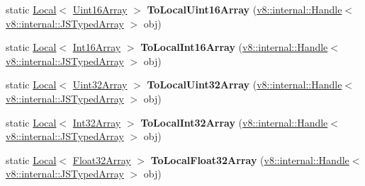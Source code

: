 \begin{DoxyCompactItemize}
\item 
static \hyperlink{classv8_1_1_local}{Local}$<$ \hyperlink{classv8_1_1_uint16_array}{Uint16\+Array} $>$ {\bfseries To\+Local\+Uint16\+Array} (\hyperlink{classv8_1_1internal_1_1_handle}{v8\+::internal\+::\+Handle}$<$ \hyperlink{classv8_1_1internal_1_1_j_s_typed_array}{v8\+::internal\+::\+J\+S\+Typed\+Array} $>$ obj)\hypertarget{classv8_1_1_utils_a2a3de4421377bd956ff04955b2d41f6d}{}\label{classv8_1_1_utils_a2a3de4421377bd956ff04955b2d41f6d}

\item 
static \hyperlink{classv8_1_1_local}{Local}$<$ \hyperlink{classv8_1_1_int16_array}{Int16\+Array} $>$ {\bfseries To\+Local\+Int16\+Array} (\hyperlink{classv8_1_1internal_1_1_handle}{v8\+::internal\+::\+Handle}$<$ \hyperlink{classv8_1_1internal_1_1_j_s_typed_array}{v8\+::internal\+::\+J\+S\+Typed\+Array} $>$ obj)\hypertarget{classv8_1_1_utils_ac87df11d66de4fdcfed5b558d4d566c0}{}\label{classv8_1_1_utils_ac87df11d66de4fdcfed5b558d4d566c0}

\item 
static \hyperlink{classv8_1_1_local}{Local}$<$ \hyperlink{classv8_1_1_uint32_array}{Uint32\+Array} $>$ {\bfseries To\+Local\+Uint32\+Array} (\hyperlink{classv8_1_1internal_1_1_handle}{v8\+::internal\+::\+Handle}$<$ \hyperlink{classv8_1_1internal_1_1_j_s_typed_array}{v8\+::internal\+::\+J\+S\+Typed\+Array} $>$ obj)\hypertarget{classv8_1_1_utils_a3ed505929d16003bffd8a4dd0948ad77}{}\label{classv8_1_1_utils_a3ed505929d16003bffd8a4dd0948ad77}

\item 
static \hyperlink{classv8_1_1_local}{Local}$<$ \hyperlink{classv8_1_1_int32_array}{Int32\+Array} $>$ {\bfseries To\+Local\+Int32\+Array} (\hyperlink{classv8_1_1internal_1_1_handle}{v8\+::internal\+::\+Handle}$<$ \hyperlink{classv8_1_1internal_1_1_j_s_typed_array}{v8\+::internal\+::\+J\+S\+Typed\+Array} $>$ obj)\hypertarget{classv8_1_1_utils_aa13bae209ba10a9e6b268ead01e12c52}{}\label{classv8_1_1_utils_aa13bae209ba10a9e6b268ead01e12c52}

\item 
static \hyperlink{classv8_1_1_local}{Local}$<$ \hyperlink{classv8_1_1_float32_array}{Float32\+Array} $>$ {\bfseries To\+Local\+Float32\+Array} (\hyperlink{classv8_1_1internal_1_1_handle}{v8\+::internal\+::\+Handle}$<$ \hyperlink{classv8_1_1internal_1_1_j_s_typed_array}{v8\+::internal\+::\+J\+S\+Typed\+Array} $>$ obj)\hypertarget{classv8_1_1_utils_a1707f254807f184579ce09e9f544d2d2}{}\label{classv8_1_1_utils_a1707f254807f184579ce09e9f544d2d2}


\end{DoxyCompactItemize}
